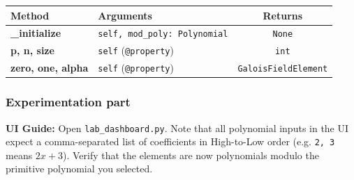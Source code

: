 \begin{center}
\renewcommand{\arraystretch}{1.5}
\begin{tabularx}{\textwidth}{@{} >{\bfseries}l X c @{}}
\toprule
Method & Arguments & Returns \\ \midrule
\_initialize & \lstinline|self, mod_poly: Polynomial| & \lstinline|None| \\
p, n, size & \lstinline|self| (\texttt{@property}) & \lstinline|int| \\
zero, one, alpha & \lstinline|self| (\texttt{@property}) & \lstinline|GaloisFieldElement| \\
\bottomrule
\end{tabularx}
\end{center}

\subsubsection*{Experimentation part}
\textbf{UI Guide:} Open \lstinline|lab_dashboard.py|. Note that all polynomial inputs in the UI expect a comma-separated list of coefficients in High-to-Low order (e.g. \lstinline|2, 3| means $2x + 3$). Verify that the elements are now polynomials modulo the primitive polynomial you selected.

\vspace{1cm}
